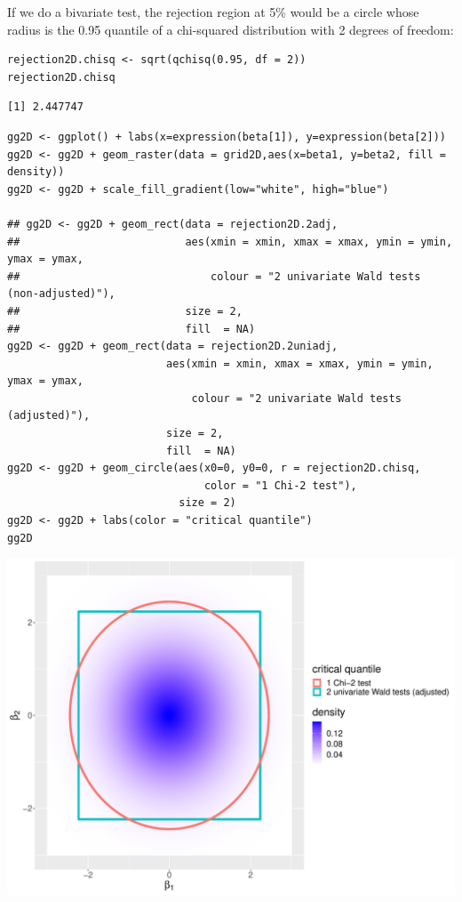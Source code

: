 \documentclass{article}
\begin{document}
If we do a bivariate test, the rejection region at 5\% would be a
circle whose radius is the 0.95 quantile of a chi-squared distribution
with 2 degrees of freedom:
\lstset{language=r,label= ,caption= ,captionpos=b,numbers=none}
\begin{lstlisting}
rejection2D.chisq <- sqrt(qchisq(0.95, df = 2))
rejection2D.chisq
\end{lstlisting}

\begin{verbatim}
[1] 2.447747
\end{verbatim}

\lstset{language=r,label= ,caption= ,captionpos=b,numbers=none}
\begin{lstlisting}
gg2D <- ggplot() + labs(x=expression(beta[1]), y=expression(beta[2]))
gg2D <- gg2D + geom_raster(data = grid2D,aes(x=beta1, y=beta2, fill = density))
gg2D <- gg2D + scale_fill_gradient(low="white", high="blue")

## gg2D <- gg2D + geom_rect(data = rejection2D.2adj, 
##                          aes(xmin = xmin, xmax = xmax, ymin = ymin, ymax = ymax, 
##                              colour = "2 univariate Wald tests (non-adjusted)"), 
##                          size = 2,
##                          fill  = NA) 
gg2D <- gg2D + geom_rect(data = rejection2D.2uniadj, 
						 aes(xmin = xmin, xmax = xmax, ymin = ymin, ymax = ymax, 
							 colour = "2 univariate Wald tests (adjusted)"), 
						 size = 2,
						 fill  = NA) 
gg2D <- gg2D + geom_circle(aes(x0=0, y0=0, r = rejection2D.chisq, 
							   color = "1 Chi-2 test"),
						   size = 2)
gg2D <- gg2D + labs(color = "critical quantile")
gg2D
\end{lstlisting}

\begin{center}
\includegraphics[width=.9\linewidth]{./figures/2D-test.pdf}
\end{center}
\end{document}
